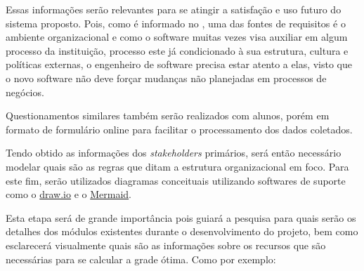 Essas informações serão relevantes para se atingir a satisfação e uso futuro do sistema proposto. Pois, como é informado no \cite{bourque_swebok_2014}, uma das fontes de requisitos é o ambiente organizacional e como o software muitas vezes visa auxiliar em algum processo da instituição, processo este já condicionado à sua estrutura, cultura e políticas externas, o engenheiro de software precisa estar atento a elas, visto que o novo software não deve forçar mudanças não planejadas em processos de negócios.

Questionamentos similares também serão realizados com alunos, porém em formato de formulário online para facilitar o processamento dos dados coletados.

\def\LinkParadigm{https://www.visual-paradigm.com/}
\def\LinkDrawio{https://www.drawio.com/}
\def\LinkMermaid{https://mermaid.js.org/}


Tendo obtido as informações dos \textit{stakeholders} primários, será então necessário modelar quais são as regras que ditam a estrutura organizacional em foco. Para este fim, serão utilizados diagramas conceituais utilizando softwares de suporte como o \href{https://draw.io/}{draw.io} e o \href{https://mermaid.js.org/}{Mermaid}.


Esta etapa será de grande importância pois guiará a pesquisa para quais serão os detalhes dos módulos existentes durante o desenvolvimento do projeto, bem como esclarecerá visualmente quais são as informações sobre os recursos que são necessárias para se calcular a grade ótima. Como por exemplo:


